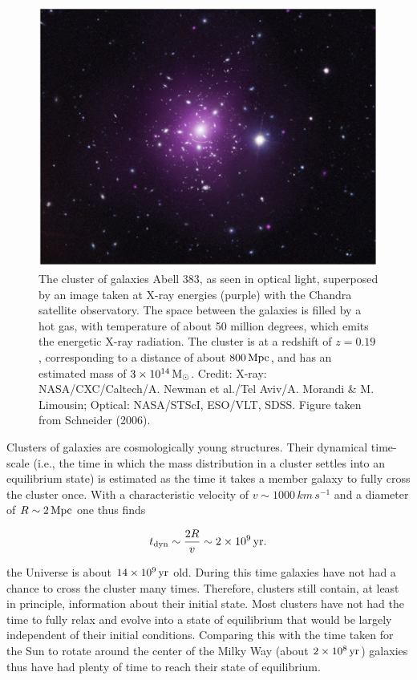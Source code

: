 \documentclass[a4paper,11pt]{article}
\begin{document}
\begin{figure}[h]
    \centering
    \includegraphics[width=14cm]{figures/Abell383.png}
    \caption{\footnotesize{The cluster of galaxies Abell 383, as seen in optical light, superposed by an image taken at X-ray energies (purple) with the Chandra satellite observatory. The space between the galaxies is filled by a hot gas, with temperature of about 50 million degrees, which emits the energetic X-ray radiation. The cluster is at a redshift of $z=0.19$, corresponding to a distance of about $800\,{\rm Mpc}$, and has an estimated mass of $3\times10^{14}\,{\rm M_\odot}$. Credit: X-ray: NASA/CXC/Caltech/A. Newman et al./Tel Aviv/A. Morandi \& M. Limousin; Optical: NASA/STScI, ESO/VLT, SDSS. Figure taken from Schneider (2006).}}
    \label{fig:abell383}
\end{figure}

{\noindent}Clusters of galaxies are cosmologically young structures. Their dynamical time-scale (i.e., the time in which the mass distribution in a cluster settles into an equilibrium state) is estimated as the time it takes a member galaxy to fully cross the cluster once. With a characteristic velocity of $v\sim1000\,{km\,s^{-1}}$ and a diameter of $R\sim2\,{\rm Mpc}$ one thus finds

\begin{align*}
    t_\mathrm{dyn} \sim \frac{2R}{v} \sim 2\times10^9\,{\rm yr}.
\end{align*}

{\noindent}the Universe is about $14\times10^9\,{\rm yr}$ old. During this time galaxies have not had a chance to cross the cluster many times. Therefore, clusters still contain, at least in principle, information about their initial state. Most clusters have not had the time to fully relax and evolve into a state of equilibrium that would be largely independent of their initial conditions. Comparing this with the time taken for the Sun to rotate around the center of the Milky Way (about $2\times10^8\,{\rm yr}$) galaxies thus have had plenty of time to reach their state of equilibrium.
\end{document}
